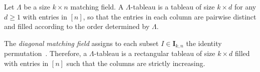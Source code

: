 \begin{Definition}
Let $\Lambda$ be a size $k \times n$ matching field. 
A $\Lambda$-tableau is a tableau of size $k \times d$ for any $d\geq 1$ with entries in $[n]$,
so that the entries in each column are pairwise distinct and filled according to the order determined by $\Lambda$. 
\end{Definition}


\begin{exam}\label{ex:diagonal1}
The \emph{diagonal matching field} assigns to
each subset $I \in \mathbf{I}_{k,n}$ the identity permutation~\cite[Example~1.3]{sturmfels1993maximal}.
Therefore, a $\Lambda$-tableau is a rectangular tableau of size $k \times d$ filled with entries in $[n]$ such that the columns are strictly increasing. 
\end{exam}

